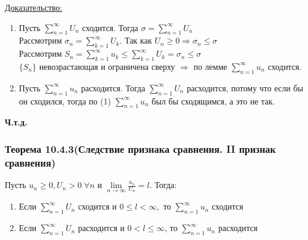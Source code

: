 \documentclass[12pt]{article}
\let\oldsum\sum
\let\oldlim\lim
\renewcommand{\sum}{\oldsum\limits}
\renewcommand{\lim}{\oldlim\limits}
\begin{document}
  \underline{Доказательство:}
  \begin{adjustwidth}{1.5em}{1.5em}
    \begin{enumerate}
      \item Пусть $\sum_{n=1}^{\infty} U_n$ сходится. Тогда $\sigma = \sum_{n=1}^{\infty}U_n$\\
      Рассмотрим $\sigma_n = \sum_{k=1}^{\infty} U_k$. Так как $U_n \geq 0 \Rightarrow \sigma_n \leq \sigma$\\
      Рассмотрим $S_n = \sum_{k=1}^{\infty} u_k \leq \sum_{k=1}^{\infty} U_k = \sigma_n \leq \sigma$\\
      $\{S_n\}$ невозрастающая и ограничена сверху $\Rightarrow$ по лемме $\sum_{n=1}^{\infty}u_n$ сходится.
      \item Пусть $\sum_{n=1}^{\infty} u_n$ расходится. Тогда $\sum_{n=1}^{\infty} U_n$ расходится, потому что если бы он 
      сходился, тогда по (1) $\sum_{n=1}^{\infty} u_n$ был бы сходящимся, а  это не так.
    \end{enumerate}
  \end{adjustwidth}
  \begin{center}
    \textbf{Ч.т.д.}
  \end{center}

  \subsubsection*{Теорема 10.4.3(Следствие признака сравнения. II признак сравнения)}\label{th:10.4.3}
  \par\noindent
  Пусть $u_n \geq 0, U_n >0 \; \forall n$ и $\lim_{n \to \infty} \frac{u_n}{U_n} = l$.
  Тогда:
  \begin{enumerate}
    \item Если $\sum_{n=1}^{\infty} U_n$ сходится и $0\leq l < \infty,$ то $\sum_{n=1}^{\infty} u_n$ сходится\\
    \item Если $\sum_{n=1}^{\infty} U_n$ расходится и $0 < l \leq \infty$, то $\sum_{n=1}^{\infty}u_n$ расходится
  \end{enumerate}
\end{document}
